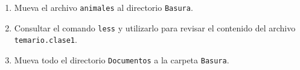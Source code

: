 \documentclass[12pt]{article}
\begin{document}
\begin{problemas}[]
\begin{enumerate}
    \item Mueva el archivo \lstinline|animales| al directorio \lstinline|Basura|.
    
    \item Consultar el comando \lstinline|less| y utilizarlo para revisar el contenido del archivo \lstinline|temario.clase1|.
    
    \item Mueva todo el directorio \lstinline|Documentos| a la carpeta \lstinline|Basura|.
\end{enumerate}
\end{problemas}






\label{LastPage}
\end{document}
